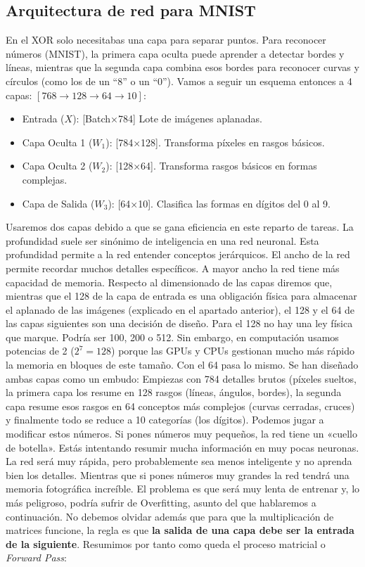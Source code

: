 \documentclass[a4paper,11pt]{article}
\begin{document}
\subsection{Arquitectura de red para MNIST}

En el XOR solo necesitabas una capa para separar puntos. Para reconocer
números (MNIST), la primera capa oculta puede aprender a detectar bordes
y líneas, mientras que la segunda capa combina esos bordes para
reconocer curvas y círculos (como los de un ``8'' o un ``0''). Vamos a
seguir un esquema entonces a 4 capas:
\([768 \rightarrow 128 \rightarrow 64 \rightarrow 10]\):

\begin{itemize}
\item
  Entrada (\(X\)): {[}Batch×784{]} Lote de imágenes aplanadas.
\item
  Capa Oculta 1 (\(W_1\)): {[}784×128{]}. Transforma píxeles en rasgos
  básicos.
\item
  Capa Oculta 2 (\(W_2\)): {[}128×64{]}. Transforma rasgos básicos en
  formas complejas.
\item
  Capa de Salida (\(W_3\)): {[}64×10{]}. Clasifica las formas en dígitos
  del 0 al 9.
\end{itemize}

Usaremos dos capas debido a que se gana eficiencia en este reparto de
tareas. La profundidad suele ser sinónimo de inteligencia en una red
neuronal. Esta profundidad permite a la red entender conceptos
jerárquicos. El ancho de la red permite recordar muchos detalles
específicos. A mayor ancho la red tiene más capacidad de memoria.
Respecto al dimensionado de las capas diremos que, mientras que el 128
de la capa de entrada es una obligación física para almacenar el
aplanado de las imágenes (explicado en el apartado anterior), el 128 y
el 64 de las capas siguientes son una decisión de diseño. Para el 128 no
hay una ley física que marque. Podría ser 100, 200 o 512. Sin embargo,
en computación usamos potencias de 2 (\(2^7=128\)) porque las GPUs y
CPUs gestionan mucho más rápido la memoria en bloques de este tamaño.
Con el 64 pasa lo mismo. Se han diseñado ambas capas como un embudo:
Empiezas con 784 detalles brutos (píxeles sueltos, la primera capa los
resume en 128 rasgos (líneas, ángulos, bordes), la segunda capa resume
esos rasgos en 64 conceptos más complejos (curvas cerradas, cruces) y
finalmente todo se reduce a 10 categorías (los dígitos). Podemos jugar a
modificar estos números. Si pones números muy pequeños, la red tiene un
«cuello de botella». Estás intentando resumir mucha información en muy
pocas neuronas. La red será muy rápida, pero probablemente sea menos
inteligente y no aprenda bien los detalles. Mientras que si pones
números muy grandes la red tendrá una memoria fotográfica increíble. El
problema es que será muy lenta de entrenar y, lo más peligroso, podría
sufrir de Overfitting, asunto del que hablaremos a continuación. No
debemos olvidar además que para que la multiplicación de matrices
funcione, la regla es que \textbf{la salida de una capa debe ser la
entrada de la siguiente}. Resumimos por tanto como queda el proceso
matricial o \emph{Forward Pass}:
\end{document}
